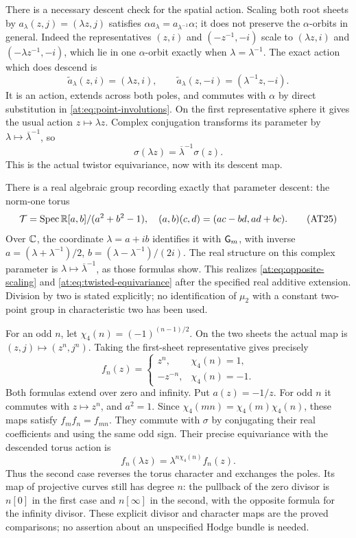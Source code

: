 There is a necessary descent check for the spatial action. Scaling
both root sheets by $a_\lambda(z,j)=(\lambda z,j)$ satisfies
$\alpha a_\lambda=a_{\lambda^{-1}}\alpha$; it does not
preserve the $\alpha$-orbits in general. Indeed the representatives
$(z,i)$ and $(-z^{-1},-i)$ scale to
$(\lambda z,i)$ and $(-\lambda z^{-1},-i)$, which lie in one
$\alpha$-orbit exactly when $\lambda=\lambda^{-1}$.
The exact action which does descend is
\[
 \widetilde a_\lambda(z,i)=(\lambda z,i),\qquad
 \widetilde a_\lambda(z,-i)=(\lambda^{-1}z,-i).
 \tag{AT23}\label{at:eq:opposite-scaling}
\]
It is an action, extends across both poles, and commutes with
$\alpha$ by direct substitution in \eqref{at:eq:point-involutions}.
On the first representative sphere it gives the usual action
$z\mapsto\lambda z$. Complex conjugation transforms its parameter
by $\lambda\mapsto\overline\lambda^{-1}$, so
\[
 \sigma(\lambda z)=\overline\lambda^{-1}\sigma(z).
 \tag{AT24}\label{at:eq:twisted-equivariance}
\]
This is the actual twistor equivariance, now with its descent map.

There is a real algebraic group recording exactly that parameter
descent: the norm-one torus
\[
 \mathcal T=\operatorname{Spec}\mathbb R[a,b]/(a^2+b^2-1),
 \quad(a,b)(c,d)=(ac-bd,ad+bc).
 \tag{AT25}\label{at:eq:real-torus}
\]
Over $\mathbb C$, the coordinate $\lambda=a+ib$ identifies it with
$\mathsf G_m$, with inverse $a=(\lambda+\lambda^{-1})/2$,
$b=(\lambda-\lambda^{-1})/(2i)$. The real structure on this
complex parameter is $\lambda\mapsto\overline\lambda^{-1}$,
as those formulas show. This realizes \eqref{at:eq:opposite-scaling}
and \eqref{at:eq:twisted-equivariance} after the specified real
additive extension. Division by two is stated explicitly; no
identification of $\mu_2$ with a constant two-point group in
characteristic two has been used.

For an odd $n$, let $\chi_4(n)=(-1)^{(n-1)/2}$. On the two
sheets the actual map is $(z,j)\mapsto(z^n,j^n)$. Taking the
first-sheet representative gives precisely
\[
 f_n(z)=\begin{cases}z^n,&\chi_4(n)=1,\\
                      -z^{-n},&\chi_4(n)=-1.
        \end{cases}
 \tag{AT26}\label{at:eq:twistor-power}
\]
Both formulas extend over zero and infinity. Put $a(z)=-1/z$.
For odd $n$ it commutes with $z\mapsto z^n$, and $a^2=1$.
Since $\chi_4(mn)=\chi_4(m)\chi_4(n)$, these maps satisfy
$f_mf_n=f_{mn}$. They commute with $\sigma$ by conjugating their
real coefficients and using the same odd sign. Their precise
equivariance with the descended torus action is
\[
 f_n(\lambda z)=\lambda^{n\chi_4(n)}f_n(z).
 \tag{AT27}\label{at:eq:power-character}
\]
Thus the second case reverses the torus character and exchanges
the poles. Its map of projective curves still has degree $n$:
the pullback of the zero divisor is $n[0]$ in the first case
and $n[\infty]$ in the second, with the opposite formula for the
infinity divisor. These explicit divisor and character maps are
the proved comparisons; no assertion about an unspecified Hodge
bundle is needed.

